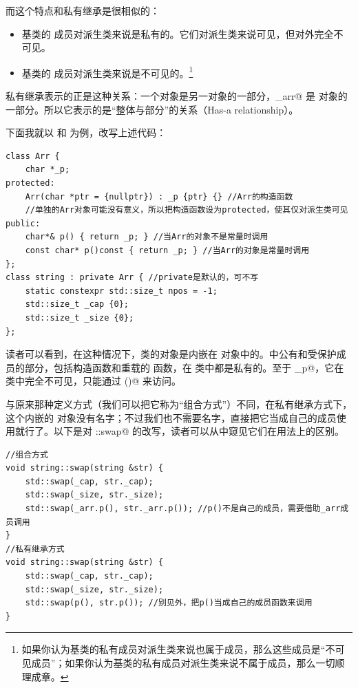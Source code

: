 而这个特点和私有继承是很相似的：
\begin{itemize}
    \item 基类的 \lstinline@public@ 成员对派生类来说是私有的。它们对派生类来说可见，但对外完全不可见。
    \item 基类的 \lstinline@private@ 成员对派生类来说是不可见的。\footnote{如果你认为基类的私有成员对派生类来说也属于成员，那么这些成员是``不可见成员''；如果你认为基类的私有成员对派生类来说不属于成员，那么一切顺理成章。}
\end{itemize}
私有继承表示的正是这种关系：一个对象是另一对象的一部分，\lstinline@_arr@ 是 \lstinline@string@ 对象的一部分。所以它表示的是``整体与部分''的关系（Has-a relationship）。\par
下面我就以 \lstinline@Arr@ 和 \lstinline@string@ 为例，改写上述代码：
\begin{lstlisting}
class Arr {
    char *_p;
protected:
    Arr(char *ptr = {nullptr}) : _p {ptr} {} //Arr的构造函数
    //单独的Arr对象可能没有意义，所以把构造函数设为protected，使其仅对派生类可见
public:
    char*& p() { return _p; } //当Arr的对象不是常量时调用
    const char* p()const { return _p; } //当Arr的对象是常量时调用
};
class string : private Arr { //private是默认的，可不写
    static constexpr std::size_t npos = -1;
    std::size_t _cap {0};
    std::size_t _size {0};
};
\end{lstlisting}\par
读者可以看到，在这种情况下，\lstinline@Arr@ 类的对象是内嵌在 \lstinline@string@ 对象中的。\lstinline@Arr@ 中公有和受保护成员的部分，包括构造函数和重载的 \lstinline@p@ 函数，在 \lstinline@string@ 类中都是私有的。至于 \lstinline@_p@，它在 \lstinline@string@ 类中完全不可见，只能通过 \lstinline@p()@ 来访问。\par
与原来那种定义方式（我们可以把它称为``组合方式''）不同，在私有继承方式下，这个内嵌的 \lstinline@Arr@ 对象没有名字；不过我们也不需要名字，直接把它当成自己的成员使用就行了。以下是对 \lstinline@string::swap@ 的改写，读者可以从中窥见它们在用法上的区别。
\begin{lstlisting}
//组合方式
void string::swap(string &str) {
    std::swap(_cap, str._cap);
    std::swap(_size, str._size);
    std::swap(_arr.p(), str._arr.p()); //p()不是自己的成员，需要借助_arr成员调用
}
//私有继承方式
void string::swap(string &str) {
    std::swap(_cap, str._cap);
    std::swap(_size, str._size);
    std::swap(p(), str.p()); //别见外，把p()当成自己的成员函数来调用
}
\end{lstlisting}\par
